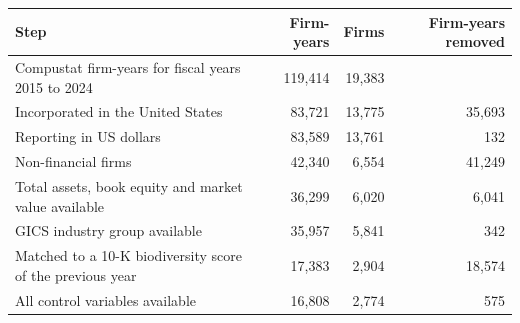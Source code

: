 \begin{tabular}{lrrr}
\toprule
Step & Firm-years & Firms & Firm-years removed \\
\midrule
Compustat firm-years for fiscal years 2015 to 2024 & 119,414 & 19,383 &  \\
Incorporated in the United States & 83,721 & 13,775 & 35,693 \\
Reporting in US dollars & 83,589 & 13,761 & 132 \\
Non-financial firms & 42,340 & 6,554 & 41,249 \\
Total assets, book equity and market value available & 36,299 & 6,020 & 6,041 \\
GICS industry group available & 35,957 & 5,841 & 342 \\
Matched to a 10-K biodiversity score of the previous year & 17,383 & 2,904 & 18,574 \\
All control variables available & 16,808 & 2,774 & 575 \\
\bottomrule
\end{tabular}
